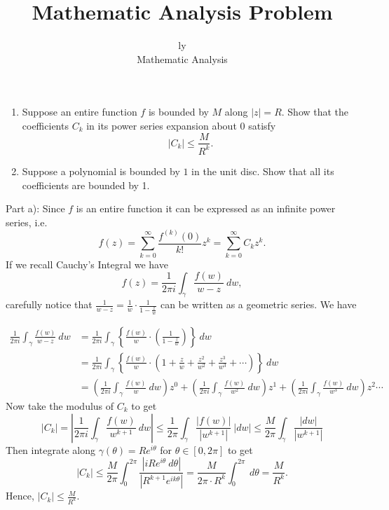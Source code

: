 \documentclass[12pt]{article}
\newenvironment{solution}[2][Solution]{\begin{trivlist}
\item[\hskip \labelsep {\bfseries #1}]}{\end{trivlist}}
\newenvironment{problem}[2][Problem]{\begin{trivlist}
\item[\hskip \labelsep {\bfseries #1}\hskip \labelsep {\bfseries #2.}]}{\end{trivlist}}
\begin{document}
 
 
\title{Mathematic Analysis Problem}%
\author{ly\\ %
Mathematic Analysis} %
 
\maketitle
\begin{problem}{1}
\begin{enumerate}[label=\alph*)]
    \item Suppose an entire function $f$ is bounded by $M$ along $|z|=R$. Show that the coefficients $C_k$ in its power series expansion about $0$ satisfy
    \[
    |C_k|\leq\frac{M}{R^k}.
    \]
    \item Suppose a polynomial is bounded by $1$ in the unit disc. Show that all its coefficients are bounded by 1.
\end{enumerate}
\end{problem}

\begin{solution}{}
Part a): Since $f$ is an entire function it can be expressed as an infinite power series, i.e.
\[
f(z)=\sum_{k=0}^\infty\frac{f^{(k)}(0)}{k!}z^k=\sum_{k=0}^\infty C_kz^k.
\]
If we recall Cauchy's Integral we have
\[
f(z)=\frac{1}{2\pi i}\int_\gamma\frac{f(w)}{w-z}\ dw,
\]
carefully notice that $\frac{1}{w-z}=\frac{1}{w}\cdot\frac{1}{1-\frac{z}{w}}$ can be written as a geometric series. We have

\begin{align*}
\frac{1}{2\pi i}\int_\gamma\frac{f(w)}{w-z}\ dw &=\frac{1}{2\pi i}\int_\gamma\left\lbrace\frac{f(w)}{w}\cdot\left(\frac{1}{1-\frac{z}{w}}\right) \right\rbrace\ dw\\[8pt]
&=\frac{1}{2\pi i}\int_\gamma\left\lbrace\frac{f(w)}{w}\cdot\left(1+\frac{z}{w}+\frac{z^2}{w^2}+\frac{z^3}{w^3}+\cdots\right) \right\rbrace\ dw\\[8pt]
&=\left(\frac{1}{2\pi i}\int_\gamma \frac{f(w)}{w}\ dw\right)z^0+\left(\frac{1}{2\pi i}\int_\gamma \frac{f(w)}{w^2}\ dw\right)z^1+\left(\frac{1}{2\pi i}\int_\gamma \frac{f(w)}{w^3}\ dw\right)z^2\cdots
\end{align*}
Now take the modulus of $C_k$ to get
\[
|C_k|=\left\lvert\frac{1}{2\pi i}\int_\gamma \frac{f(w)}{w^{k+1}}\ dw \right\rvert\leq\frac{1}{2\pi}\int_\gamma\frac{|f(w)|}{|w^{k+1}|}\ |dw|\leq \frac{M}{2\pi}\int_\gamma\frac{|dw|}{|w^{k+1}|}
\]
Then integrate along $\gamma(\theta)=Re^{i\theta}$ for $\theta\in [0,2\pi]$ to get
\[
|C_k|\leq \frac{M}{2\pi}\int_0^{2\pi}\frac{|iRe^{i\theta}\ d\theta|}{|R^{k+1}e^{ik\theta}|}=\frac{M}{2\pi\cdot R^k}\int_0^{2\pi}\ d\theta=\frac{M}{R^k}.
\]
Hence, $|C_k|\leq \frac{M}{R^k}$.
\end{solution}
\end{document}
